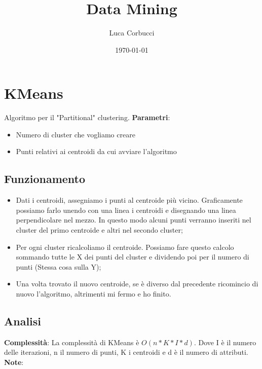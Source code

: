 \documentclass[14pt]{extreport}
\title{Data Mining}
\author{Luca Corbucci}
\date{\today}
\begin{document}
\maketitle

\tableofcontents

\chapter{KMeans}

Algoritmo per il "Partitional" clustering.
\newline
\newline
{\bf Parametri}:

\begin{itemize}
    \item Numero di cluster che vogliamo creare
    \item Punti relativi ai centroidi da cui avviare l'algoritmo
\end{itemize}


\section{Funzionamento}

\begin{itemize}
    \item Dati i centroidi, assegniamo i punti al centroide più vicino. Graficamente possiamo farlo unendo con una linea i centroidi e disegnando una linea perpendicolare nel mezzo. In questo modo alcuni punti verranno inseriti nel cluster del primo centroide e altri nel secondo cluster;
    \item Per ogni cluster ricalcoliamo il centroide. Possiamo fare questo calcolo sommando tutte le X dei punti del cluster e dividendo poi per il numero di punti (Stessa cosa sulla Y);
    \item Una volta trovato il nuovo centroide, se è diverso dal precedente ricomincio di nuovo l'algoritmo, altrimenti mi fermo e ho finito.
\end{itemize}


\section{Analisi}

{\bf Complessità}:
\newline
\newline
La complessità di KMeans è $O(n*K*I*d)$. Dove I è il numero delle iterazioni, n il numero di punti, K i centroidi e d è il numero di attributi.
\newline
\newline
{\bf Note}:
\end{document}
